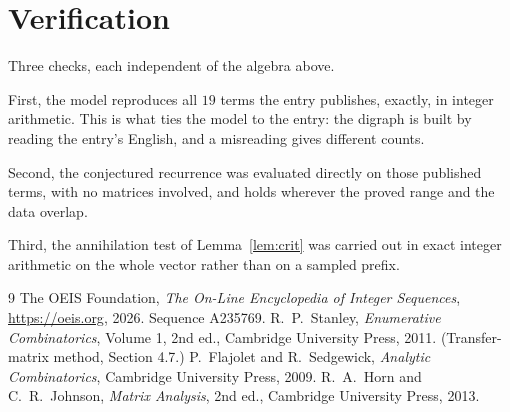 \documentclass[11pt,a4paper]{article}
\theoremstyle{plain}
\theoremstyle{definition}
\begin{document}
\section{Verification}

Three checks, each independent of the algebra above.

First, the model reproduces all $19$ terms the entry publishes, exactly, in integer
arithmetic. This is what ties the model to the entry: the digraph is built by reading the
entry's English, and a misreading gives different counts.

Second, the conjectured recurrence was evaluated directly on those published terms, with no
matrices involved, and holds wherever the proved range and the data overlap.

Third, the annihilation test of Lemma~\ref{lem:crit} was carried out in exact integer
arithmetic on the whole vector rather than on a sampled prefix.

\begin{thebibliography}{9}
 The OEIS Foundation, \emph{The On-Line Encyclopedia of Integer
Sequences}, \url{https://oeis.org}, 2026. Sequence A235769.
 R.~P.~Stanley, \emph{Enumerative Combinatorics}, Volume 1, 2nd ed.,
Cambridge University Press, 2011. (Transfer-matrix method, Section 4.7.)
 P.~Flajolet and R.~Sedgewick, \emph{Analytic Combinatorics}, Cambridge
University Press, 2009.
 R.~A.~Horn and C.~R.~Johnson, \emph{Matrix Analysis}, 2nd ed., Cambridge
University Press, 2013.
\end{thebibliography}
\end{document}
